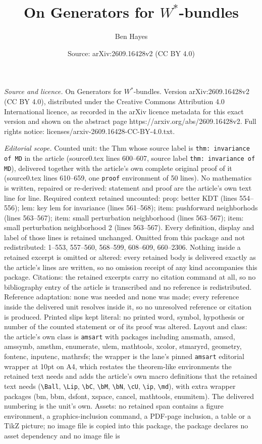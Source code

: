 \documentclass[10pt,a4paper]{amsart}
\title[On Generators for $W^{*}$-bundles]{On Generators for $W^{*}$-bundles}
\author{Ben Hayes}
\date{Source: arXiv:2609.16428v2 (CC BY 4.0)}
\begin{document}
\maketitle

\noindent\emph{Source and licence.} On Generators for $W^{*}$-bundles. Version arXiv:2609.16428v2 (CC BY 4.0), distributed under the Creative Commons Attribution 4.0 International licence, as recorded in the arXiv licence metadata for this exact version and shown on the abstract page https://arxiv.org/abs/2609.16428v2. Full rights notice: licenses/arxiv-2609.16428-CC-BY-4.0.txt.\par\smallskip

\noindent\textit{Editorial scope.} Counted unit: the Thm whose source label is \texttt{thm: invariance of MD} in the article (source0.tex lines 600--607, source label \texttt{thm: invariance of MD}), delivered together with the article's own complete original proof of it (source0.tex lines 610--659, one \texttt{proof} environment of 50 lines). No mathematics is written, repaired or re-derived: statement and proof are the article's own text line for line. Required context retained uncounted: prop: better KDT (lines 554--556); lem: key lem for invariance (lines 561--568); item: pushforward neighborhods (lines 563--567); item: small perturbation neighborhood (lines 563--567); item: small perturbation neighborhood 2 (lines 563--567). Every definition, display and label of those lines is retained unchanged. Omitted from this package and not redistributed: 1--553, 557--560, 568--599, 608--609, 660--2306. Nothing inside a retained excerpt is omitted or altered: every retained body is delivered exactly as the article's lines are written, so no omission receipt of any kind accompanies this package. Citations: the retained excerpts carry no citation command at all, so no bibliography entry of the article is transcribed and no reference is redistributed. Reference adaptation: none was needed and none was made; every reference inside the delivered unit resolves inside it, so no unresolved reference or citation is produced. Printed slips kept literal: no printed word, symbol, hypothesis or number of the counted statement or of its proof was altered. Layout and class: the article's own class is \texttt{amsart} with packages including amsmath, amscd, amssymb, amsthm, enumerate, ulem, mathtools, xcolor, stmaryrd, geometry, fontenc, inputenc, mathrsfs; the wrapper is the lane's pinned \texttt{amsart} editorial wrapper at 10pt on A4, which restates the theorem-like environments the retained text needs and adds the article's own macro definitions that the retained text needs (\texttt{\textbackslash Ball}, \texttt{\textbackslash Lip}, \texttt{\textbackslash bC}, \texttt{\textbackslash bM}, \texttt{\textbackslash bN}, \texttt{\textbackslash cU}, \texttt{\textbackslash ip}, \texttt{\textbackslash md}), with extra wrapper packages (bm, bbm, dsfont, xspace, cancel, mathtools, enumitem). The delivered numbering is the unit's own. Assets: no retained span contains a figure environment, a graphics-inclusion command, a PDF-page inclusion, a table or a TikZ picture; no image file is copied into this package, the package declares no asset dependency and no image file is 
\end{document}
